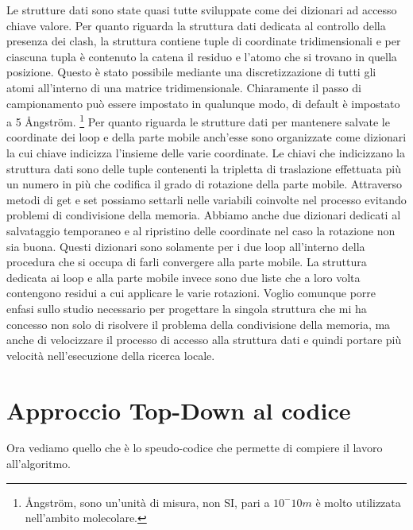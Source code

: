 Le strutture dati sono state quasi tutte sviluppate come dei dizionari ad accesso chiave valore. Per quanto riguarda la struttura dati dedicata al controllo della presenza dei clash, la struttura contiene tuple di coordinate tridimensionali e per ciascuna tupla è contenuto la catena il residuo e l'atomo che si trovano in quella posizione. Questo è stato possibile mediante una discretizzazione di tutti gli atomi all'interno di una matrice tridimensionale. Chiaramente il passo di campionamento può essere impostato in qualunque modo, di default è impostato a 5 Ångström. \footnote{Ångström, sono un'unità di misura, non SI, pari a $10^-10m$ è molto utilizzata nell'ambito molecolare.} Per quanto riguarda le strutture dati per mantenere salvate le coordinate dei loop e della parte mobile anch'esse sono organizzate come dizionari la cui chiave indicizza l'insieme delle varie coordinate. Le chiavi che indicizzano la struttura dati sono delle tuple contenenti la tripletta di traslazione effettuata più un numero in più che codifica il grado di rotazione della parte mobile. Attraverso metodi di get e set possiamo settarli nelle variabili coinvolte nel processo evitando problemi di condivisione della memoria.
Abbiamo anche due dizionari dedicati al salvataggio temporaneo e al ripristino delle coordinate nel caso la rotazione non sia buona. Questi dizionari sono solamente per i due loop all'interno della procedura che si occupa di farli convergere alla parte mobile. La struttura dedicata ai loop e alla parte mobile invece sono due liste che a loro volta contengono residui a cui applicare le varie rotazioni. Voglio comunque porre enfasi sullo studio necessario per progettare la singola struttura che mi ha concesso non solo di risolvere il problema della condivisione della memoria, ma anche di velocizzare il processo di accesso alla struttura dati e quindi portare più velocità nell'esecuzione della ricerca locale.


\section{Approccio Top-Down al codice}\label{sec:ApproccioTopDown}
Ora vediamo quello che è lo speudo-codice che permette di compiere il lavoro all'algoritmo. 

